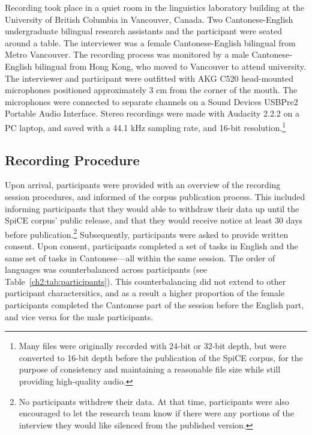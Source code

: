 Recording took place in a quiet room in the linguistics laboratory building at the University of British Columbia in Vancouver, Canada. Two Cantonese-English undergraduate bilingual research assistants and the participant were seated around a table. The interviewer was a female Cantonese-English bilingual from Metro Vancouver. The recording process was monitored by a male Cantonese-English bilingual from Hong Kong, who moved to Vancouver to attend university. The interviewer and participant were outfitted with AKG C520 head-mounted microphones positioned approximately 3 cm from the corner of the mouth. The microphones were connected to separate channels on a Sound Devices USBPre2 Portable Audio Interface. Stereo recordings were made with Audacity 2.2.2 \citep{audacity_2018_audio} on a PC laptop, and saved with a 44.1 kHz sampling rate, and 16-bit resolution.\footnote{Many files were originally recorded with 24-bit or 32-bit depth, but were converted to 16-bit depth before the publication of the SpiCE corpus, for the purpose of consistency and maintaining a reasonable file size while still providing high-quality audio.}

\subsection{Recording Procedure}\label{ch2:subsec:procedure}

Upon arrival, participants were provided with an overview of the recording session procedures, and informed of the corpus publication process. This included informing participants that they would able to withdraw their data up until the SpiCE corpus' public release, and that they would receive notice at least 30 days before publication.\footnote{No participants withdrew their data. At that time, participants were also encouraged to let the research team know if there were any portions of the interview they would like silenced from the published version.} Subsequently, participants were asked to provide written consent. Upon consent, participants completed a set of tasks in English and the same set of tasks in Cantonese---all within the same session. The order of languages was counterbalanced across participants (see Table~\ref{ch2:tab:participants}). This counterbalancing did not extend to other participant charactersitics, and as a result a higher proportion of the female participants completed the Cantonese part of the session before the English part, and vice versa for the male participants. 
 
